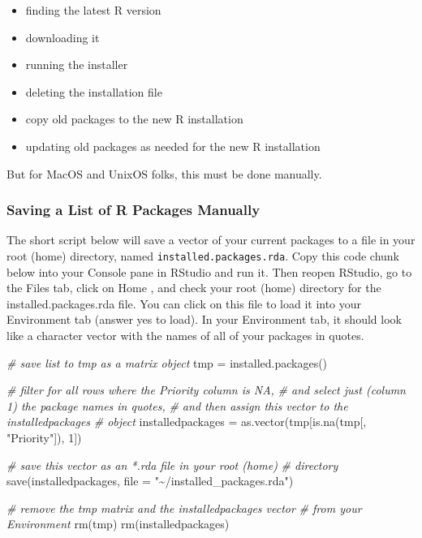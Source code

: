 \documentclass[
]{book}
\newenvironment{Shaded}{\begin{snugshade}}{\end{snugshade}}
\newcommand{\AttributeTok}[1]{\textcolor[rgb]{0.77,0.63,0.00}{#1}}
\newcommand{\CommentTok}[1]{\textcolor[rgb]{0.56,0.35,0.01}{\textit{#1}}}
\newcommand{\DecValTok}[1]{\textcolor[rgb]{0.00,0.00,0.81}{#1}}
\newcommand{\FunctionTok}[1]{\textcolor[rgb]{0.00,0.00,0.00}{#1}}
\newcommand{\NormalTok}[1]{#1}
\newcommand{\OtherTok}[1]{\textcolor[rgb]{0.56,0.35,0.01}{#1}}
\newcommand{\StringTok}[1]{\textcolor[rgb]{0.31,0.60,0.02}{#1}}
\providecommand{\tightlist}{%
  \setlength{\itemsep}{0pt}\setlength{\parskip}{0pt}}
\begin{document}
\begin{itemize}
\tightlist
\item
  finding the latest R version
\item
  downloading it
\item
  running the installer
\item
  deleting the installation file
\item
  copy old packages to the new R installation
\item
  updating old packages as needed for the new R installation
\end{itemize}

But for MacOS and UnixOS folks, this must be done manually.

\hypertarget{saving-a-list-of-r-packages-manually}{%
\subsubsection{Saving a List of R Packages Manually}\label{saving-a-list-of-r-packages-manually}}

The short script below will save a vector of your current packages to a file in your root (home) directory, named \texttt{installed.packages.rda}. Copy this code chunk below into your Console pane in RStudio and run it. Then reopen RStudio, go to the Files tab, click on Home , and check your root (home) directory for the installed.packages.rda file. You can click on this file to load it into your Environment tab (answer yes to load). In your Environment tab, it should look like a character vector with the names of all of your packages in quotes.

\begin{Shaded}
\begin{Highlighting}[]
\CommentTok{\# save list to tmp as a matrix object}
\NormalTok{tmp }\OtherTok{=} \FunctionTok{installed.packages}\NormalTok{()}

\CommentTok{\# filter for all rows where the \textquotesingle{}Priority\textquotesingle{} column is NA,}
\CommentTok{\# and select just (column 1) the package names in quotes,}
\CommentTok{\# and then assign this vector to the installedpackages}
\CommentTok{\# object}
\NormalTok{installedpackages }\OtherTok{=} \FunctionTok{as.vector}\NormalTok{(tmp[}\FunctionTok{is.na}\NormalTok{(tmp[, }\StringTok{"Priority"}\NormalTok{]), }\DecValTok{1}\NormalTok{])}

\CommentTok{\# save this vector as an *.rda file in your root (home)}
\CommentTok{\# directory}
\FunctionTok{save}\NormalTok{(installedpackages, }\AttributeTok{file =} \StringTok{"\textasciitilde{}/installed\_packages.rda"}\NormalTok{)}

\CommentTok{\# remove the tmp matrix and the installedpackages vector}
\CommentTok{\# from your Environment}
\FunctionTok{rm}\NormalTok{(tmp)}
\FunctionTok{rm}\NormalTok{(installedpackages)}
\end{Highlighting}
\end{Shaded}
\end{document}
